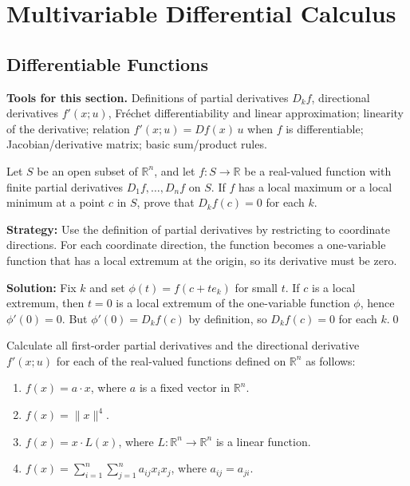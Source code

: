 \chapter{Multivariable Differential Calculus}

\section{Differentiable Functions}

\noindent\textbf{Tools for this section.} Definitions of partial derivatives $D_k f$, directional derivatives $f'(x;u)$, Fréchet differentiability and linear approximation; linearity of the derivative; relation $f'(x;u)=Df(x)\,u$ when $f$ is differentiable; Jacobian/derivative matrix; basic sum/product rules.



\begin{problembox}
Let \( S \) be an open subset of \( \mathbb{R}^n \), and let \( f: S \to \mathbb{R} \) be a real-valued function with finite partial derivatives \( D_1f, \ldots, D_nf \) on \( S \). If \( f \) has a local maximum or a local minimum at a point \( c \) in \( S \), prove that \( D_kf(c) = 0 \) for each \( k \).
\end{problembox}

\noindent\textbf{Strategy:} Use the definition of partial derivatives by restricting to coordinate directions. For each coordinate direction, the function becomes a one-variable function that has a local extremum at the origin, so its derivative must be zero.

\bigskip\noindent\textbf{Solution:}
Fix $k$ and set $\phi(t)=f(c+te_k)$ for small $t$. If $c$ is a local extremum, then $t=0$ is a local extremum of the one-variable function $\phi$, hence $\phi'(0)=0$. But $\phi'(0)=D_k f(c)$ by definition, so $D_k f(c)=0$ for each $k$.\qed


\begin{problembox}
Calculate all first-order partial derivatives and the directional derivative \( f'(x; u) \) for each of the real-valued functions defined on \( \mathbb{R}^n \) as follows:
\begin{enumerate}[label=(\alph*)]
\item \( f(x) = a \cdot x \), where \( a \) is a fixed vector in \( \mathbb{R}^n \).
\item \( f(x) = \|x\|^4 \).
\item \( f(x) = x \cdot L(x) \), where \( L : \mathbb{R}^n \to \mathbb{R}^n \) is a linear function.
\item \( f(x) = \sum_{i=1}^{n} \sum_{j=1}^{n} a_{ij}x_i x_j \), where \( a_{ij} = a_{ji} \).
\end{enumerate}
\end{problembox}

